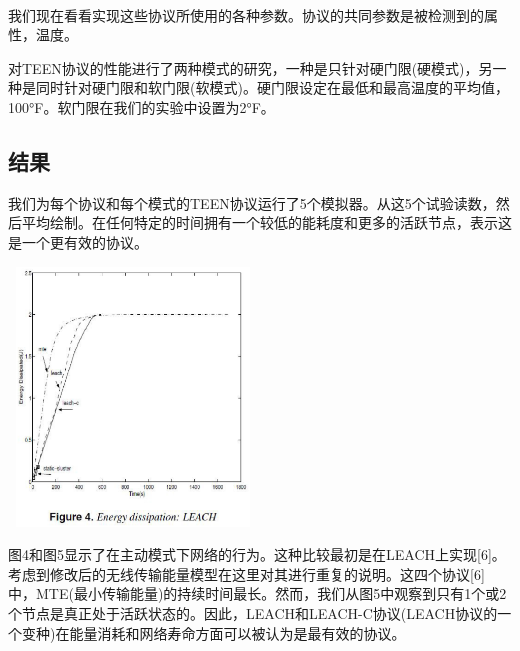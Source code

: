 \documentclass[journal]{IEEEtran}
\begin{document}
\begin{CJK}{UTF8}{gbsn}
\

我们现在看看实现这些协议所使用的各种参数。协议的共同参数是被检测到的属性，温度。

对TEEN协议的性能进行了两种模式的研究，一种是只针对硬门限(硬模式)，另一种是同时针对硬门限和软门限(软模式)。硬门限设定在最低和最高温度的平均值，100°F。软门限在我们的实验中设置为2°F。

\subsection{\textbf{结果}}

我们为每个协议和每个模式的TEEN协议运行了5个模拟器。从这5个试验读数，然后平均绘制。在任何特定的时间拥有一个较低的能耗度和更多的活跃节点，表示这是一个更有效的协议。

\noindent
\includegraphics[height=260, width=250]{4.eps}

图4和图5显示了在主动模式下网络的行为。这种比较最初是在LEACH上实现[6]。考虑到修改后的无线传输能量模型在这里对其进行重复的说明。这四个协议[6]中，MTE(最小传输能量)的持续时间最长。然而，我们从图5中观察到只有1个或2个节点是真正处于活跃状态的。因此，LEACH和LEACH-C协议(LEACH协议的一个变种)在能量消耗和网络寿命方面可以被认为是最有效的协议。


\end{CJK}
\end{document}
